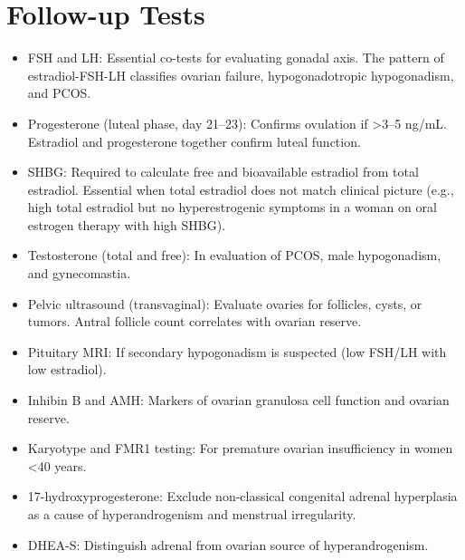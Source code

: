 \section*{Follow-up Tests}
\begin{itemize}
  \item FSH and LH: Essential co-tests for evaluating gonadal axis. The pattern of estradiol-FSH-LH classifies ovarian failure, hypogonadotropic hypogonadism, and PCOS.
  \item Progesterone (luteal phase, day 21--23): Confirms ovulation if >3--5 ng/mL. Estradiol and progesterone together confirm luteal function.
  \item SHBG: Required to calculate free and bioavailable estradiol from total estradiol. Essential when total estradiol does not match clinical picture (e.g., high total estradiol but no hyperestrogenic symptoms in a woman on oral estrogen therapy with high SHBG).
  \item Testosterone (total and free): In evaluation of PCOS, male hypogonadism, and gynecomastia.
  \item Pelvic ultrasound (transvaginal): Evaluate ovaries for follicles, cysts, or tumors. Antral follicle count correlates with ovarian reserve.
  \item Pituitary MRI: If secondary hypogonadism is suspected (low FSH/LH with low estradiol).
  \item Inhibin B and AMH: Markers of ovarian granulosa cell function and ovarian reserve.
  \item Karyotype and FMR1 testing: For premature ovarian insufficiency in women <40 years.
  \item 17-hydroxyprogesterone: Exclude non-classical congenital adrenal hyperplasia as a cause of hyperandrogenism and menstrual irregularity.
  \item DHEA-S: Distinguish adrenal from ovarian source of hyperandrogenism.
\end{itemize}

